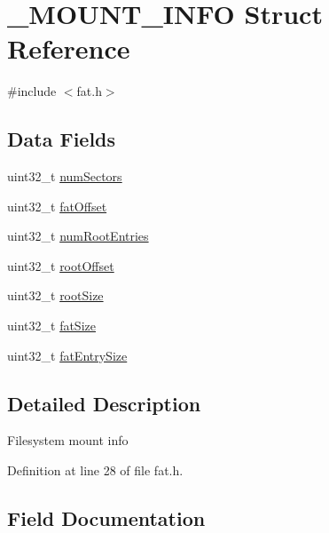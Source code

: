 \hypertarget{struct__MOUNT__INFO}{}\section{\+\_\+\+M\+O\+U\+N\+T\+\_\+\+I\+N\+FO Struct Reference}
\label{struct__MOUNT__INFO}


{\ttfamily \#include $<$fat.\+h$>$}

\subsection*{Data Fields}
\begin{DoxyCompactItemize}
\item 
uint32\+\_\+t \hyperlink{struct__MOUNT__INFO_a0071bda2d72096f634544df8aacc3f32}{num\+Sectors}
\item 
uint32\+\_\+t \hyperlink{struct__MOUNT__INFO_a1aa114acfe01f60c8a85fe7a01d5c96d}{fat\+Offset}
\item 
uint32\+\_\+t \hyperlink{struct__MOUNT__INFO_afacdf709c99a10da00c6859acd935334}{num\+Root\+Entries}
\item 
uint32\+\_\+t \hyperlink{struct__MOUNT__INFO_aeccc0a73a2a1f4d2a55cd938461bcd45}{root\+Offset}
\item 
uint32\+\_\+t \hyperlink{struct__MOUNT__INFO_afe78a775d2d21ba728ffb7df951c26a2}{root\+Size}
\item 
uint32\+\_\+t \hyperlink{struct__MOUNT__INFO_a1c27dc07d9399da26e9836433514537e}{fat\+Size}
\item 
uint32\+\_\+t \hyperlink{struct__MOUNT__INFO_ade01217e0a9e58634a65b1279bbe95c6}{fat\+Entry\+Size}
\end{DoxyCompactItemize}


\subsection{Detailed Description}
Filesystem mount info 

Definition at line 28 of file fat.\+h.



\subsection{Field Documentation}
